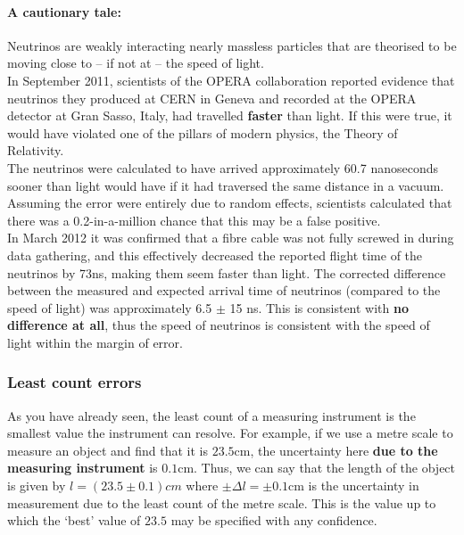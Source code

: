 \begin{tip}
\paragraph{A cautionary tale:} Neutrinos are weakly interacting nearly massless particles that are theorised to be moving close to -- if not at -- the speed of light.\\

In September 2011, scientists of the OPERA collaboration reported evidence that neutrinos they produced at CERN in Geneva and recorded at the OPERA detector at Gran Sasso, Italy, had travelled \textbf{faster} than light. If this were true, it would have violated one of the pillars of modern physics, the Theory of Relativity.\\

The neutrinos were calculated to have arrived approximately 60.7 nanoseconds  sooner than light would have if it had traversed the same distance in a vacuum. Assuming the error were entirely due to random effects, scientists calculated that there was a 0.2-in-a-million chance that this may be a false positive.\\

In March 2012 it was confirmed that a fibre cable was not fully screwed in during data gathering, and this effectively decreased the reported flight time of the neutrinos by 73ns, making them seem faster than light. The corrected difference between the measured and expected arrival time of neutrinos (compared to the speed of light) was approximately 6.5 $\pm$ 15 ns. This is consistent with \textbf{no difference at all}, thus the speed of neutrinos is consistent with the speed of light within the margin of error.
\end{tip}

\subsubsection{Least count errors}

As you have already seen, the least count of a measuring instrument is the smallest value the instrument can resolve. For example, if we use a metre scale to measure an object and find that it is $23.5$cm, the uncertainty here \textbf{due to the measuring instrument} is $0.1$cm. Thus, we can say that the length of the object is given by $l = (23.5 \pm 0.1) cm$ where $\pm \Delta l = \pm 0.1$cm is the uncertainty in measurement due to the least count of the metre scale. This is the value up to which the `best' value of $23.5$ may be specified with any confidence.

